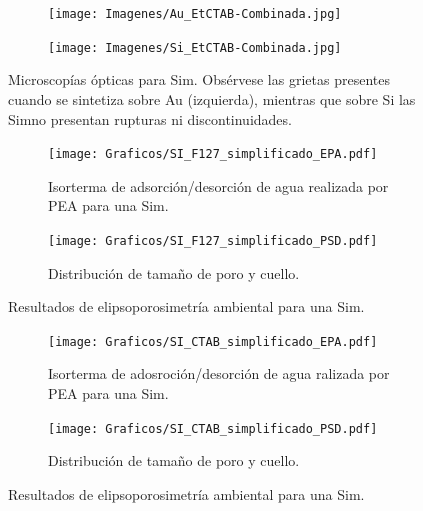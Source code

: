 \begin{figure}[th!]
			 \label{fig:Microscopia_F127_simplificado}	
	 		\vspace*{1cm}
 	   	    \begin{subfigure}{0.495\textwidth}
	       	\texttt{[image: Imagenes/Au\_EtCTAB-Combinada.jpg]}
	   		\end{subfigure}
	   		\begin{subfigure}{0.495\textwidth}
	   	    \texttt{[image: Imagenes/Si\_EtCTAB-Combinada.jpg]}
	   		\end{subfigure}
			 \caption[Microscopías \pdmC\space tratamiento simplificado.]{Microscopías ópticas para Sim\pdmC. Obsérvese las grietas presentes cuando se sintetiza sobre Au (izquierda), mientras que sobre Si las Sim\pdmC\space no presentan rupturas ni discontinuidades.}
			 \label{fig:Microscopia_CTAB_simplificado}	
		     \end{figure}	
		
	  	 \begin{figure}
			  	\begin{subfigure}{0.495\textwidth}
			  	\texttt{[image: Graficos/SI\_F127\_simplificado\_EPA.pdf]}
				\caption{Isorterma de adsorción/desorción de agua realizada por PEA para una Sim\pdmF.}
				\label{fig:F127_simplificado_EPA}
				\end{subfigure}
				\begin{subfigure}{0.495\textwidth}
			  	\texttt{[image: Graficos/SI\_F127\_simplificado\_PSD.pdf]}
				\caption{Distribución de tamaño de poro y cuello.\\ }
				\label{fig:F127_simplificado_PSD}
				\end{subfigure}
				\caption[Elipsoporosimetría \pdmF\space tratamiento simplificado.]{Resultados de elipsoporosimetría ambiental para una Sim\pdmF\space.}
				\label{fig:F127_simplificado}
				\end{figure}
	
		  \begin{figure}	
			\begin{subfigure}{0.495\textwidth}
		  	\texttt{[image: Graficos/SI\_CTAB\_simplificado\_EPA.pdf]}
			\caption{Isorterma de adosroción/desorción de agua ralizada por PEA para una Sim\pdmC.}
			\label{fig:CTAB_simplificado_EPA}
			\end{subfigure}
			\begin{subfigure}{0.495\textwidth}
		  	\texttt{[image: Graficos/SI\_CTAB\_simplificado\_PSD.pdf]}
			\caption{Distribución de tamaño de poro y cuello.\\ }
			\label{fig:CTAB_simplificado_PSD}
			\end{subfigure}
			\caption[Elipsoporosimetría \pdmC\space tratamiento simplificado.]{Resultados de elipsoporosimetría ambiental para una Sim\pdmC.}
			\end{figure}			

